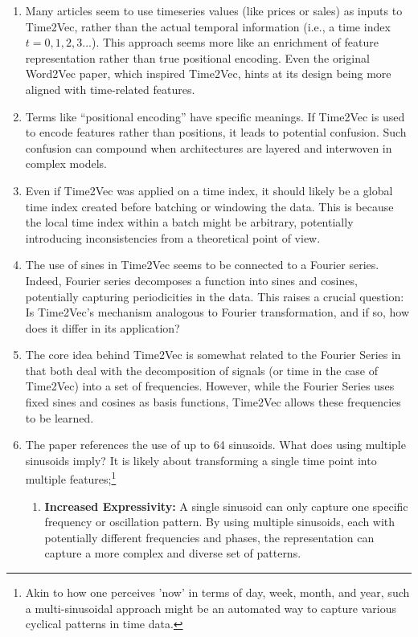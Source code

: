 \documentclass{tufte-handout}
\begin{document}
\begin{enumerate}
\item Many articles seem to use timeseries values (like prices or sales) as inputs to Time2Vec, rather than the actual temporal information (i.e., a time index \( t=0,1,2,3...\)). This approach seems more like an enrichment of feature representation rather than true positional encoding. Even the original Word2Vec paper\cite{word2vec}, which inspired Time2Vec, hints at its design being more aligned with time-related features.

\item Terms like ``positional encoding'' have specific meanings. If Time2Vec is used to encode features rather than positions, it leads to potential confusion. Such confusion can compound when architectures are layered and interwoven in complex models.

\item Even if Time2Vec was applied on a time index, it should likely be a global time index created before batching or windowing the data. This is because the local time index within a batch might be arbitrary, potentially introducing inconsistencies from a theoretical point of view.

\item The use of sines in Time2Vec seems to be connected to a Fourier series. Indeed, Fourier series decomposes a function into sines and cosines, potentially capturing periodicities in the data. This raises a crucial question: Is Time2Vec's mechanism analogous to Fourier transformation, and if so, how does it differ in its application?

\item The core idea behind Time2Vec is somewhat related to the Fourier Series in that both deal with the decomposition of signals (or time in the case of Time2Vec) into a set of frequencies. However, while the Fourier Series uses fixed sines and cosines as basis functions, Time2Vec allows these frequencies to be learned.

\item The paper references the use of up to 64 sinusoids. What does using multiple sinusoids imply? It is likely about transforming a single time point into multiple features;\footnote{Akin to how one perceives 'now' in terms of day, week, month, and year, such a multi-sinusoidal approach might be an automated way to capture various cyclical patterns in time data.}
	\begin{enumerate}
	    \item \textbf{Increased Expressivity:} A single sinusoid can only capture one specific frequency or oscillation pattern. By using multiple sinusoids, each with potentially different frequencies and phases, the representation can capture a more complex and diverse set of patterns.


\end{enumerate}
\end{enumerate}
\end{document}
